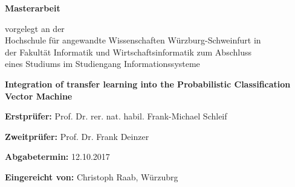 \begin{titlepage}
\vspace*{2cm}
\centering 
	{\Huge\bfseries Masterarbeit\par}
	\vspace{1.5cm}
	{vorgelegt an der\\
		Hochschule für angewandte Wissenschaften Würzburg-Schweinfurt in\\
		der Fakultät Informatik und Wirtschaftsinformatik zum Abschluss\\
		eines Studiums im Studiengang Informationssysteme
	\par}
	\vspace{2.5cm}
	{\Large\bfseries Integration of transfer learning into the Probabilistic Classification Vector Machine \par}
	\vspace{2cm}

\raggedright
	\vfill
	\textbf{Erstprüfer:} Prof. Dr. rer. nat. habil. Frank-Michael Schleif\par
	\textbf{Zweitprüfer:} Prof. Dr. Frank Deinzer\par
	\textbf{Abgabetermin:} 12.10.2017\par
	
\raggedleft
	\vfill
	\textbf{Eingereicht von:} Christoph Raab, Würzubrg\par
	
\end{titlepage}
